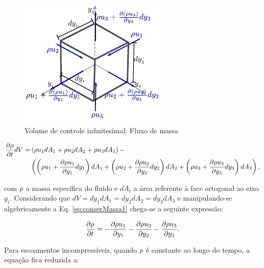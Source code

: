 \documentclass[tese_patricia]{subfiles}%
\begin{document}
\begin{figure}[htb!]
	\centering 
	\includegraphics[scale=1.5,trim=0cm 0.0cm 0cm 0.0cm, clip=true]{Imagens/Cap2/conserMassa.pdf}	
	\caption{Volume de controle infinitesimal: Fluxo de massa}
	\label{fig:VolInfi}
\end{figure}


\begin{align}
	\begin{split}
	\frac{\partial \rho}{\partial t}dV =& \left(\rho u_1 dA_{1}  +  \rho u_2 dA_{2} + \rho u_3  dA_{3} \right) - \\  &\left(\left(\rho u_1 + \frac{\partial \rho u_1}{\partial y_1}dy_1 \right)dA_{1} + \left(\rho u_2+ \frac{\partial \rho u_2}{\partial y_2}dy_2 \right) dA_{2} + \left(\rho u_3 + \frac{\partial \rho u_3}{\partial y_3}dy_3 \right) dA_{3}\right), \label{eq:conserMassa1} 
	\end{split}
\end{align}

\noindent com $\rho$ a massa específica do fluido e $dA_{i}$ a área referente à face ortogonal ao eixo $y_i$. Considerando que $dV = dy_1dA_1 = dy_2dA_2 = dy_3dA_3 $  e manipulando-se algebricamente a Eq. \ref{eq:conserMassa1} chega-se a seguinte expressão:

\begin{align}
	\frac{\partial \rho}{\partial t} = - \frac{\partial \rho u_{1}}{\partial y_1} - \frac{\partial \rho u_{2}}{\partial y_2}- \frac{\partial \rho u_{3}}{\partial y_3}.
	\label{eq:conserMassa} 
\end{align}

Para escoamentos incompressíveis, quando $\rho$ é constante ao longo do tempo, a equação fica reduzida a:
\end{document}
